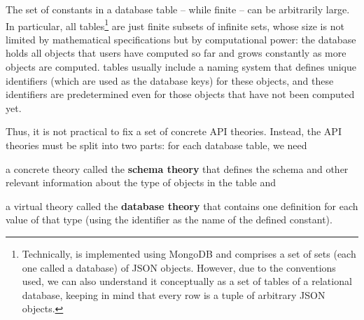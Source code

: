 The set of constants in a database table -- while finite -- can be arbitrarily large.
In particular, all \lmfdb tables\footnote{Technically, \lmfdb is implemented using MongoDB and comprises a set of sets (each one called a database) of JSON objects. 
However, due to the conventions used, we can also understand it conceptually as a set of tables of a relational database, keeping in mind that every row is a tuple of arbitrary JSON objects.}
are just finite subsets of infinite sets, whose size is not limited by mathematical specifications but by computational power: the database holds all objects that users have computed so far and grows constantly as more objects are computed.
\lmfdb tables usually include a naming system that defines unique identifiers (which are used as the database keys) for these objects, and these identifiers are predetermined even for those objects that have not been computed yet.

Thus, it is not practical to fix a set of concrete API theories.
Instead, the API theories must be split into two parts: for each database table, we need
\begin{compactitem}
  \item a concrete theory called the \textbf{schema theory} that defines the schema  and other relevant information about the type of objects in the table and
  \item a virtual theory called the \textbf{database theory} that contains one definition for each value of that type (using the \lmfdb identifier as the name of the defined constant). 
\end{compactitem}

